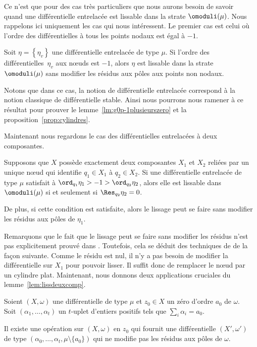 Ce n'est que pour des cas très particuliers que nous aurons besoin de savoir quand une différentielle entrelacée est lissable dans la strate $\omoduli(\mu)$. Nous rappelons ici uniquement les cas qui nous intéressent. Le premier cas est celui où l'ordre des différentielles à tous les points nodaux est égal à $-1$.
\begin{lem}\label{lem:lisspolessimples}
Soit $\eta=\left\{\eta_{v}\right\}$ une différentielle entrelacée de type $\mu$. Si l'ordre des différentielles~$\eta_v$ aux nœuds est $-1$, alors $\eta$ est lissable dans la strate $\omoduli(\mu)$ sans modifier les résidus aux pôles aux points non nodaux.
\end{lem}
Notons que dans ce cas, la notion de différentielle entrelacée correspond à la notion classique de différentielle stable. Ainsi nous pourrons nous ramener à ce résultat pour prouver le lemme~\ref{lm:g0p-1plusieurszero} et la proposition~\ref{prop:cylindres}.

Maintenant nous regardons le cas des différentielles entrelacées à deux composantes.
\begin{lem}\label{lem:lissdeuxcomp}
Supposons que $X$ possède exactement deux composantes $X_{1}$ et $X_{2}$ reliées par un unique nœud qui identifie $q_1 \in X_{1}$ à $q_2 \in X_{2}$. Si une différentielle entrelacée de type $\mu$ satisfait à $\ord_{q_1} \eta_{1}>-1>\ord_{q_2} \eta_{2}$, alors elle est lissable dans $\omoduli(\mu)$ si et seulement si $\Res_{q_2}\eta_{2}=0$.

De plus, si cette condition est satisfaite, alors le lissage peut se faire sans modifier les résidus aux pôles de $\eta_{1}$.
\end{lem}
Remarquons que le fait que le lissage peut se faire sans modifier les résidus n'est pas explicitement prouvé dans \cite{BCGGM}. Toutefois, cela se déduit des techniques de \cite{BCGGM} de la façon suivante. Comme le résidu est nul, il n'y a pas besoin de modifier la différentielle sur $X_{1}$ pour pouvoir lisser. Il suffit donc de remplacer le nœud par un cylindre plat.
Maintenant, nous donnons deux applications cruciales du lemme~\ref{lem:lissdeuxcomp}.
\begin{prop}\label{prop:eclatZero}
Soient $(X,\omega)$ une différentielle de type $\mu$ et $z_{0}\in X$ un zéro d'ordre $a_{0}$ de $\omega$. Soit $(\alpha_{1},\dots,\alpha_{t})$ un $t$-uplet d'entiers positifs tels que $\sum_{i}\alpha_{i}=a_{0}$.

Il existe une opération sur $(X,\omega)$ en $z_{0}$ qui fournit une différentielle $(X',\omega')$ de type $(\alpha_{0},\dots,\alpha_{t},\mu\setminus\lbrace a_{0}\rbrace)$ qui ne modifie pas les résidus aux pôles de $\omega$.
\end{prop}

